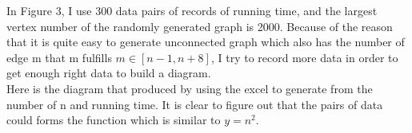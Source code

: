 \documentclass[]{article}
\begin{document}
	\noindent In Figure 3, I use 300 data pairs of records of running time, and the largest vertex number of the randomly generated graph is 2000. Because of the reason that it is quite easy to generate unconnected graph which also has the number of edge m that m fulfills $m\in[n-1,n+8]$, I try to record more data in order to get enough right data to build a diagram. \\
	
	\noindent Here is the diagram that produced by using the excel to generate from the number of n and running time. It is clear to figure out that the pairs of data could forms the function which is similar to $y=n^{2}$.\\
	
	\clearpage
	
\end{document}
